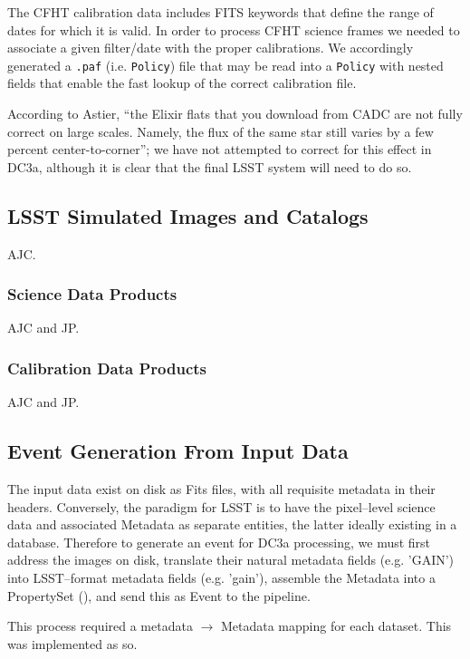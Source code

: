 The CFHT calibration data includes FITS keywords that define the range
of dates for which it is valid.  In order to process CFHT science frames
we needed to associate a given filter/date with the proper calibrations.  We
accordingly generated a \texttt{.paf} (i.e. \texttt{Policy}) file that may
be read into a \texttt{Policy} with nested fields that enable the fast
lookup of the correct calibration file.

According to Astier, ``the Elixir flats that you download from CADC
are not fully correct on large scales. Namely, the flux of the same
star still varies by a few percent center-to-corner'';  we have not
attempted to correct for this effect in DC3a,  although it is clear
that the final LSST system will need to do so.

\subsection{LSST Simulated Images and Catalogs}

AJC.

\subsubsection{Science Data Products}

AJC and JP.

\subsubsection{Calibration Data Products}

AJC and JP.



\subsection{Event Generation From Input Data}

The input data exist on disk as Fits files, with all requisite
metadata in their headers.  Conversely, the paradigm for LSST is to
have the pixel--level science data and associated Metadata as separate
entities, the latter ideally existing in a database.  Therefore to
generate an event for DC3a processing, we must first address the
images on disk, translate their natural metadata fields (e.g. 'GAIN')
into LSST--format metadata fields (e.g. 'gain'), assemble the Metadata
into a PropertySet (), and
send this as Event to the pipeline.

This process required a metadata $\rightarrow$ Metadata mapping for each dataset.
This was implemented as so.
